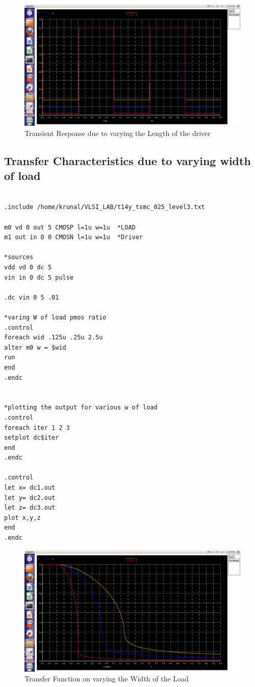 \documentclass[12pt,a4paper]{article}
\begin{document}
\begin{center}
\begin{figure}[!ht]
\centering
\includegraphics[scale=0.37]{lab3_pic3_52_transient_dueto_varing_Lof_driver.png}
\caption[Short]{Transient Response due to varying the Length of the driver}
\end{figure}

\clearpage
\subsection{Transfer Characteristics due to varying width of load}
\begin{lstlisting}

.include /home/krunal/VLSI_LAB/t14y_tsmc_025_level3.txt

m0 vd 0 out 5 CMOSP l=1u w=1u  *LOAD 
m1 out in 0 0 CMOSN l=1u w=1u  *Driver

*sources
vdd vd 0 dc 5 
vin in 0 dc 5 pulse

.dc vin 0 5 .01

*varing W of load pmos ratio
.control
foreach wid .125u .25u 2.5u
alter m0 w = $wid
run 
end
.endc


*plotting the output for various w of load
.control
foreach iter 1 2 3
setplot dc$iter
end
.endc

.control
let x= dc1.out
let y= dc2.out
let z= dc3.out
plot x,y,z
end
.endc
\end{lstlisting}
\clearpage
\begin{figure}[!ht]
\centering
\includegraphics[scale=0.37]{lab3_pic3_6_transfer_fun_dueto_varing_Wof_load.png}
\caption[Short]{Transfer Function on varying the Width of the Load}
\end{figure}


\end{center}
\end{document}
